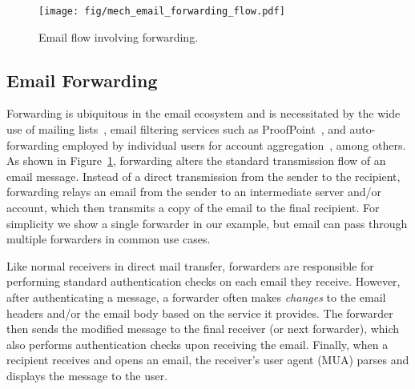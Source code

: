 \begin{figure}[t]
\centerline{\texttt{[image: fig/mech\_email\_forwarding\_flow.pdf]}}
\caption[Email Flow Involving Forwarding]{Email flow involving forwarding.}
\label{fig:email_forwarding_flow}
  \vspace*{-0.1in}
\end{figure}


\subsection{Email Forwarding}
\label{sec:background:fwd:overview}
Forwarding is ubiquitous in the email ecosystem and is necessitated by
the wide use of mailing lists~\cite{Electron8:online}, email filtering
services such as ProofPoint~\cite{SecureEm78:online}, and
auto-forwarding employed by individual users for account
aggregation~\cite{TheBestW9:online}, among others.  As shown in
Figure~\ref{fig:email_forwarding_flow}, forwarding alters the standard
transmission flow of an email message.  Instead of a direct
transmission from the sender to the recipient, forwarding relays an
email from the sender to an intermediate server and/or account, which
then transmits a copy of the email to the final recipient.
For simplicity we show a single forwarder in our example, but email can pass through multiple forwarders in common use cases. %

Like normal receivers in direct mail transfer,
forwarders are responsible for performing standard authentication checks on each email they receive. %
However, after authenticating a message,
a forwarder often makes \emph{changes} to the email headers and/or the
email body based on the service it provides.
The forwarder then sends the modified message to the final receiver (or next forwarder), which also performs authentication checks upon receiving the email.
Finally, when a recipient receives and opens an email, the receiver's user agent (MUA) parses and displays the message to the user.

